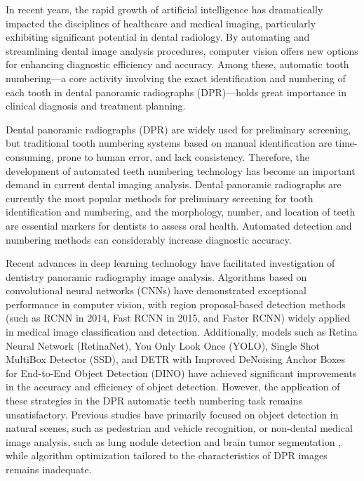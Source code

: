 \documentclass[pdflatex,sn-mathphys-num]{sn-jnl}%
\theoremstyle{thmstyleone}%
\theoremstyle{thmstyletwo}%
\theoremstyle{thmstylethree}%
\begin{document}
In recent years, the rapid growth of artificial intelligence has dramatically impacted the disciplines of healthcare and medical imaging, particularly exhibiting significant potential in dental radiology\cite{i0}.  By automating and streamlining dental image analysis procedures, computer vision offers new options for enhancing diagnostic efficiency and accuracy.  Among these, automatic tooth numbering—a core activity involving the exact identification and numbering of each tooth in dental panoramic radiographs (DPR)—holds great importance in clinical diagnosis and treatment planning.

Dental panoramic radiographs (DPR) are widely used for preliminary screening, but traditional tooth numbering systems based on manual identification are time-consuming, prone to human error, and lack consistency\cite{i3}. Therefore, the development of automated teeth numbering technology has become an important demand in current dental imaging analysis.  Dental panoramic radiographs are currently the most popular methods for preliminary screening for tooth identification and numbering\cite{i4}, and the morphology, number, and location of teeth are essential markers for dentists to assess oral health.  Automated detection and numbering methods can considerably increase diagnostic accuracy\cite{i5}.

 Recent advances in deep learning technology have facilitated investigation of dentistry panoramic radiography image analysis.  Algorithms based on convolutional neural networks (CNNs) have demonstrated exceptional performance in computer vision, with region proposal-based detection methods (such as RCNN in 2014, Fast RCNN in 2015, and Faster RCNN\cite{i6}\cite{i7}\cite{i8}) widely applied in medical image classification and detection.  Additionally, models such as Retina Neural Network (RetinaNet), You Only Look Once (YOLO), Single Shot MultiBox Detector (SSD), and DETR with Improved DeNoising Anchor Boxes for End-to-End Object Detection (DINO) have achieved significant improvements in the accuracy and efficiency of object detection\cite{i9}\cite{i10}\cite{i11}\cite{i12}.  However, the application of these strategies in the DPR automatic teeth numbering task remains unsatisfactory.  Previous studies have primarily focused on object detection in natural scenes, such as pedestrian and vehicle recognition, or non-dental medical image analysis, such as lung nodule detection \cite{i13} and brain tumor segmentation \cite{i14}, while algorithm optimization tailored to the characteristics of DPR images remains inadequate.
\end{document}
